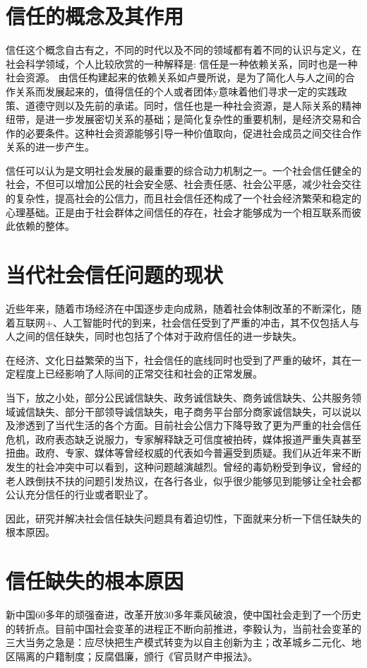 \documentclass[UTF8]{ctexart}
\begin{document}
    \section{信任的概念及其作用}
    信任这个概念自古有之，不同的时代以及不同的领域都有着不同的认识与定义，在社会科学领域，个人比较欣赏的一种解释是: 信任是一种依赖关系，同时也是一种社会资源。 由信任构建起来的依赖关系如卢曼所说，是为了简化人与人之间的合作关系而发展起来的，值得信任的个人或者团体y意味着他们寻求一定的实践政策、道德守则以及先前的承诺。同时，信任也是一种社会资源，是人际关系的精神纽带，是进一步发展密切关系的基础；是简化复杂性的重要机制，是经济交易和合作的必要条件。这种社会资源能够引导一种价值取向，促进社会成员之间交往合作关系的进一步产生。

    信任可以认为是文明社会发展的最重要的综合动力机制之一。一个社会信任健全的社会，不但可以增加公民的社会安全感、社会责任感、社会公平感，减少社会交往的复杂性，提高社会的公信力，而且社会信任还构成了一个社会经济繁荣和稳定的心理基础。正是由于社会群体之间信任的存在，社会才能够成为一个相互联系而彼此依赖的整体。

    \section{当代社会信任问题的现状}
    近些年来，随着市场经济在中国逐步走向成熟，随着社会体制改革的不断深化，随着互联网+、人工智能时代的到来，社会信任受到了严重的冲击，其不仅包括人与人之间的信任缺失，同时也包括了个体对于政府信任的进一步缺失。

    在经济、文化日益繁荣的当下，社会信任的底线同时也受到了严重的破坏，其在一定程度上已经影响了人际间的正常交往和社会的正常发展。

    当下，放之小处，部分公民诚信缺失、政务诚信缺失、商务诚信缺失、公共服务领域诚信缺失、部分干部领导诚信缺失，电子商务平台部分商家诚信缺失，可以说以及渗透到了当代生活的各个方面。目前社会公信力下降导致了更为严重的社会信任危机，政府表态缺乏说服力，专家解释缺乏可信度被拍砖，媒体报道严重失真甚至扭曲。政府、专家、媒体等曾经权威的代表如今普遍受到质疑。我们从近年来不断发生的社会冲突中可以看到，这种问题越演越烈。曾经的毒奶粉受到争议，曾经的老人跌倒扶不扶的问题引发热议，在各行各业，似乎很少能够见到能够让全社会都公认充分信任的行业或者职业了。

    因此，研究并解决社会信任缺失问题具有着迫切性，下面就来分析一下信任缺失的根本原因。

    \section{信任缺失的根本原因}
    新中国60多年的顽强奋进，改革开放30多年乘风破浪，使中国社会走到了一个历史的转折点。目前中国社会变革的进程正不断向前推进，李毅认为，当前社会变革的三大当务之急是：应尽快把生产模式转变为以自主创新为主；改革城乡二元化、地区隔离的户籍制度；反腐倡廉，颁行《官员财产申报法》。
\end{document}
